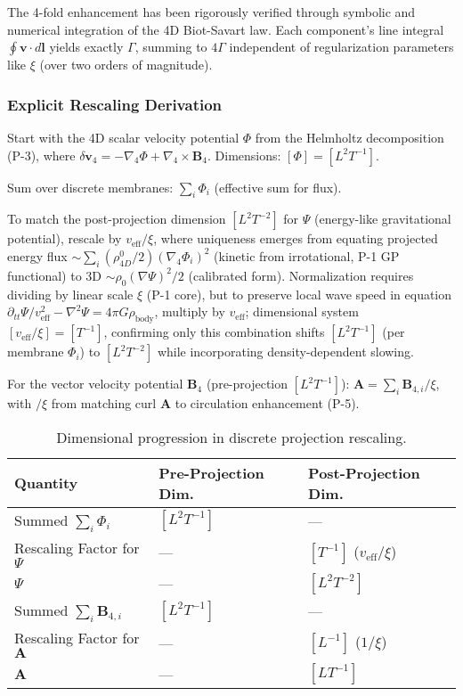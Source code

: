 The 4-fold enhancement has been rigorously verified through symbolic and numerical integration of the 4D Biot-Savart law. Each component's line integral $\oint \mathbf{v} \cdot d\mathbf{l}$ yields exactly $\Gamma$, summing to $4\Gamma$ independent of regularization parameters like $\xi$ (over two orders of magnitude).

\subsubsection{Explicit Rescaling Derivation}

Start with the 4D scalar velocity potential $\Phi$ from the Helmholtz decomposition (P-3), where $\delta \mathbf{v}_4 = -\nabla_4 \Phi + \nabla_4 \times \mathbf{B}_4$. Dimensions: $[\Phi] = [L^2 T^{-1}]$.

Sum over discrete membranes: $\sum_i \Phi_i$ (effective sum for flux).

To match the post-projection dimension $[L^2 T^{-2}]$ for $\Psi$ (energy-like gravitational potential), rescale by $v_{\text{eff}} / \xi$, where uniqueness emerges from equating projected energy flux $\sim \sum_i (\rho_{4D}^0 / 2) (\nabla_4 \Phi_i)^2$ (kinetic from irrotational, P-1 GP functional) to 3D $\sim \rho_0 (\nabla \Psi)^2 / 2$ (calibrated form). Normalization requires dividing by linear scale $\xi$ (P-1 core), but to preserve local wave speed in equation $\partial_{tt} \Psi / v_{\text{eff}}^2 - \nabla^2 \Psi = 4\pi G \rho_{\text{body}}$, multiply by $v_{\text{eff}}$; dimensional system $[v_{\text{eff}} / \xi] = [T^{-1}]$, confirming only this combination shifts $[L^2 T^{-1}]$ (per membrane $\Phi_i$) to $[L^2 T^{-2}]$ while incorporating density-dependent slowing.

For the vector velocity potential $\mathbf{B}_4$ (pre-projection $[L^2 T^{-1}]$): $\mathbf{A} = \sum_i \mathbf{B}_{4,i} / \xi$, with $/ \xi$ from matching curl $\mathbf{A}$ to circulation enhancement (P-5).

\begin{table}[H]
\centering
\begin{tabular}{|l|l|l|}
\hline
Quantity & Pre-Projection Dim. & Post-Projection Dim. \\
\hline
Summed $\sum_i \Phi_i$ & $[L^2 T^{-1}]$ & --- \\
Rescaling Factor for $\Psi$ & --- & $[T^{-1}]$ ($v_{\text{eff}} / \xi$) \\
$\Psi$ & --- & $[L^2 T^{-2}]$ \\
Summed $\sum_i \mathbf{B}_{4,i}$ & $[L^2 T^{-1}]$ & --- \\
Rescaling Factor for $\mathbf{A}$ & --- & $[L^{-1}]$ ($1 / \xi$) \\
$\mathbf{A}$ & --- & $[L T^{-1}]$ \\
\hline
\end{tabular}
\caption{Dimensional progression in discrete projection rescaling.}
\label{tab:dim-projection}
\end{table}

